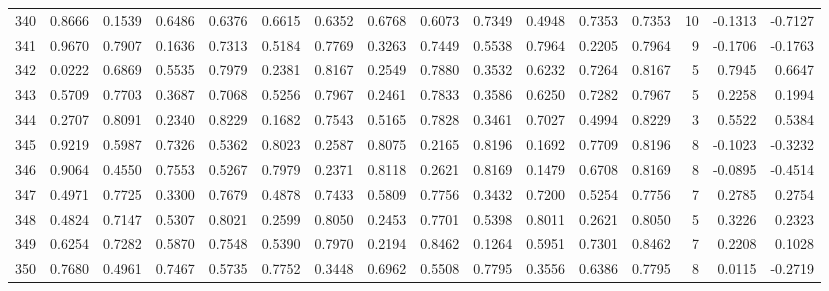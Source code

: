 \begin{tabular}{lrrrrrrrrrrrrrrr}
340 &      0.8666 &  0.1539 &  0.6486 &  0.6376 &  0.6615 &  0.6352 &  0.6768 &  0.6073 &  0.7349 &  0.4948 &   0.7353 &     0.7353 &     10 &                   -0.1313 &                    -0.7127 \\
341 &      0.9670 &  0.7907 &  0.1636 &  0.7313 &  0.5184 &  0.7769 &  0.3263 &  0.7449 &  0.5538 &  0.7964 &   0.2205 &     0.7964 &      9 &                   -0.1706 &                    -0.1763 \\
342 &      0.0222 &  0.6869 &  0.5535 &  0.7979 &  0.2381 &  0.8167 &  0.2549 &  0.7880 &  0.3532 &  0.6232 &   0.7264 &     0.8167 &      5 &                    0.7945 &                     0.6647 \\
343 &      0.5709 &  0.7703 &  0.3687 &  0.7068 &  0.5256 &  0.7967 &  0.2461 &  0.7833 &  0.3586 &  0.6250 &   0.7282 &     0.7967 &      5 &                    0.2258 &                     0.1994 \\
344 &      0.2707 &  0.8091 &  0.2340 &  0.8229 &  0.1682 &  0.7543 &  0.5165 &  0.7828 &  0.3461 &  0.7027 &   0.4994 &     0.8229 &      3 &                    0.5522 &                     0.5384 \\
345 &      0.9219 &  0.5987 &  0.7326 &  0.5362 &  0.8023 &  0.2587 &  0.8075 &  0.2165 &  0.8196 &  0.1692 &   0.7709 &     0.8196 &      8 &                   -0.1023 &                    -0.3232 \\
346 &      0.9064 &  0.4550 &  0.7553 &  0.5267 &  0.7979 &  0.2371 &  0.8118 &  0.2621 &  0.8169 &  0.1479 &   0.6708 &     0.8169 &      8 &                   -0.0895 &                    -0.4514 \\
347 &      0.4971 &  0.7725 &  0.3300 &  0.7679 &  0.4878 &  0.7433 &  0.5809 &  0.7756 &  0.3432 &  0.7200 &   0.5254 &     0.7756 &      7 &                    0.2785 &                     0.2754 \\
348 &      0.4824 &  0.7147 &  0.5307 &  0.8021 &  0.2599 &  0.8050 &  0.2453 &  0.7701 &  0.5398 &  0.8011 &   0.2621 &     0.8050 &      5 &                    0.3226 &                     0.2323 \\
349 &      0.6254 &  0.7282 &  0.5870 &  0.7548 &  0.5390 &  0.7970 &  0.2194 &  0.8462 &  0.1264 &  0.5951 &   0.7301 &     0.8462 &      7 &                    0.2208 &                     0.1028 \\
350 &      0.7680 &  0.4961 &  0.7467 &  0.5735 &  0.7752 &  0.3448 &  0.6962 &  0.5508 &  0.7795 &  0.3556 &   0.6386 &     0.7795 &      8 &                    0.0115 &                    -0.2719 \\

\end{tabular}
